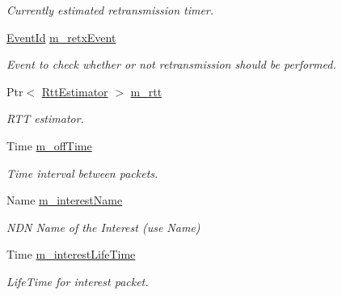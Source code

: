 \begin{DoxyCompactItemize}
\begin{DoxyCompactList}\small\item\em Currently estimated retransmission timer. \end{DoxyCompactList}\item 
\hyperlink{classEventId}{Event\+Id} \hyperlink{classns3_1_1ndn_1_1Consumer_a49bf33baf2cb0254736a11dbaf9fcf03}{m\+\_\+retx\+Event}\hypertarget{classns3_1_1ndn_1_1Consumer_a49bf33baf2cb0254736a11dbaf9fcf03}{}\label{classns3_1_1ndn_1_1Consumer_a49bf33baf2cb0254736a11dbaf9fcf03}

\begin{DoxyCompactList}\small\item\em Event to check whether or not retransmission should be performed. \end{DoxyCompactList}\item 
Ptr$<$ \hyperlink{classns3_1_1ndn_1_1RttEstimator}{Rtt\+Estimator} $>$ \hyperlink{classns3_1_1ndn_1_1Consumer_a150cdf24ed67d6aeeb24be58e1262b59}{m\+\_\+rtt}\hypertarget{classns3_1_1ndn_1_1Consumer_a150cdf24ed67d6aeeb24be58e1262b59}{}\label{classns3_1_1ndn_1_1Consumer_a150cdf24ed67d6aeeb24be58e1262b59}

\begin{DoxyCompactList}\small\item\em R\+TT estimator. \end{DoxyCompactList}\item 
Time \hyperlink{classns3_1_1ndn_1_1Consumer_adfdf8893787c66d7c89b4fc87abfba36}{m\+\_\+off\+Time}\hypertarget{classns3_1_1ndn_1_1Consumer_adfdf8893787c66d7c89b4fc87abfba36}{}\label{classns3_1_1ndn_1_1Consumer_adfdf8893787c66d7c89b4fc87abfba36}

\begin{DoxyCompactList}\small\item\em Time interval between packets. \end{DoxyCompactList}\item 
Name \hyperlink{classns3_1_1ndn_1_1Consumer_a11d6716730a853a7cb2ead9c50bbefbc}{m\+\_\+interest\+Name}\hypertarget{classns3_1_1ndn_1_1Consumer_a11d6716730a853a7cb2ead9c50bbefbc}{}\label{classns3_1_1ndn_1_1Consumer_a11d6716730a853a7cb2ead9c50bbefbc}

\begin{DoxyCompactList}\small\item\em N\+DN Name of the Interest (use Name) \end{DoxyCompactList}\item 
Time \hyperlink{classns3_1_1ndn_1_1Consumer_adad8e55fa1027e4c9850538e1e8622a7}{m\+\_\+interest\+Life\+Time}\hypertarget{classns3_1_1ndn_1_1Consumer_adad8e55fa1027e4c9850538e1e8622a7}{}\label{classns3_1_1ndn_1_1Consumer_adad8e55fa1027e4c9850538e1e8622a7}

\begin{DoxyCompactList}\small\item\em Life\+Time for interest packet. \end{DoxyCompactList}\end{DoxyCompactItemize}


